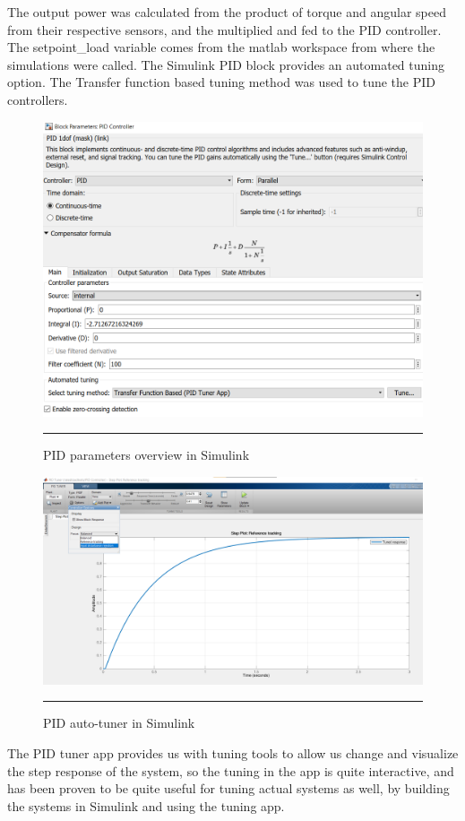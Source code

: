 The output power was calculated from the product of torque and angular speed from their respective sensors, and the multiplied and fed to the PID controller. The setpoint\_load variable comes from the matlab workspace from where the simulations were called.
The Simulink PID block provides an automated tuning option. The Transfer function based tuning method was used to tune the PID controllers.

\begin{figure}[htbp]
	\centering
		\includegraphics[width = 4.5in]{./Figures/MS/fig319.png}
		\rule{35em}{0.5pt}
	\caption{PID parameters overview in Simulink}
	\label{fig:PID parameters overview in Simulink}
\end{figure}

\begin{figure}[htbp]
	\centering
		\includegraphics[width = 4.5in]{./Figures/MS/fig320.png}
		\rule{35em}{0.5pt}
	\caption{PID auto-tuner in Simulink}
	\label{fig:PID auto-tuner in Simulink}
\end{figure}
The PID tuner app provides us with tuning tools to allow us change and visualize the step response of the system, so the tuning in the app is quite interactive, and has been proven to be quite useful for tuning actual systems as well, by building the systems in Simulink and using the tuning app.

